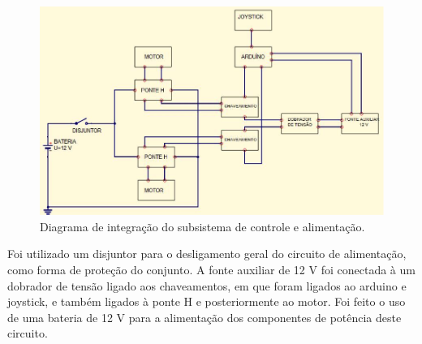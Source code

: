 \begin{figure}
    \begin{center}
        \includegraphics{figuras/circuito_integrado_cadeira.png}
    \end{center}
    \caption{Diagrama de integração do subsistema de controle e alimentação.}
    \label{fig:circuito_integrado_cadeira.png}
\end{figure}

Foi utilizado um disjuntor para o desligamento geral do circuito de alimentação, como forma de proteção do conjunto. A fonte auxiliar de 12 V foi conectada à um dobrador de tensão ligado aos chaveamentos, em que foram ligados ao arduino e joystick, e também ligados à ponte H e posteriormente ao motor. Foi feito o uso de uma bateria de 12 V para a alimentação dos componentes  de potência deste circuito.
